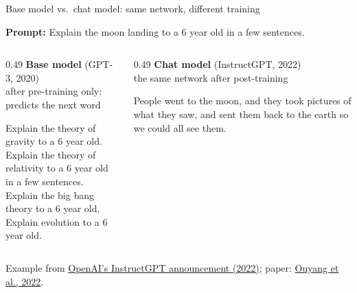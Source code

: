 \begin{frame}{Base model vs.\ chat model: same network, different training}
\begin{userbox}\textbf{Prompt:} Explain the moon landing to a 6 year old in a few sentences.\end{userbox}
\vspace{4pt}
\begin{columns}[T]
\begin{column}{0.49\textwidth}
\centering\textbf{Base model} (GPT-3, 2020)\\[-1pt]{\small\color{midgray} after pre-training only: predicts the next word}
\begin{modelbox}[midgray]
Explain the theory of gravity to a 6 year old.\\
Explain the theory of relativity to a 6 year old in a few sentences.\\
Explain the big bang theory to a 6 year old.\\
Explain evolution to a 6 year old.
\end{modelbox}
\end{column}
\begin{column}{0.49\textwidth}
\centering\textbf{Chat model} (InstructGPT, 2022)\\[-1pt]{\small\color{midgray} the same network after post-training}
\begin{modelbox}
People went to the moon, and they took pictures of what they saw, and sent them back to the earth so we could all see them.
\end{modelbox}
\end{column}
\end{columns}
\vspace{4pt}
\vspace{2pt}
{\scriptsize\color{midgray} Example from \href{https://openai.com/index/instruction-following/}{OpenAI's InstructGPT announcement (2022)}; paper: \href{https://arxiv.org/abs/2203.02155}{Ouyang et al., 2022}.}
\end{frame}

